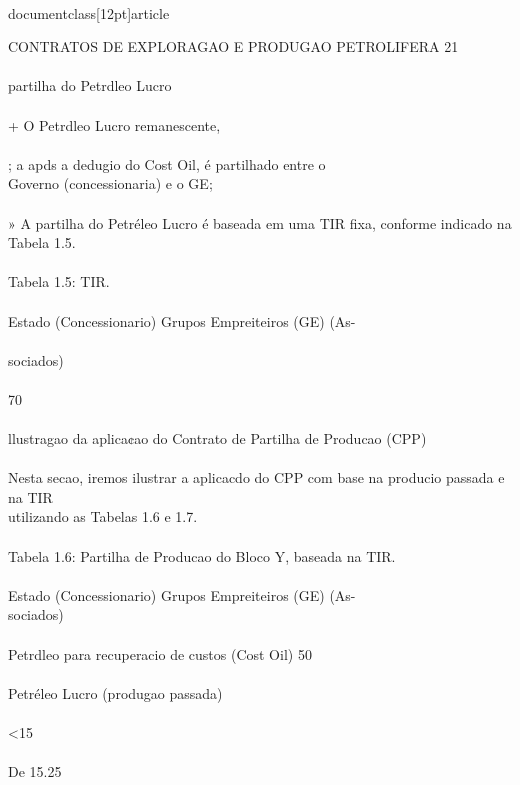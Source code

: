 \\documentclass[12pt]{article}
\begin{document}
CONTRATOS DE EXPLORAGAO E PRODUGAO PETROLIFERA 21\\
\\
partilha do Petrdleo Lucro\\
\\
+ O Petrdleo Lucro remanescente,\\
\\
; a apds a dedugio do Cost Oil, é partilhado entre o\\
Governo (concessionaria) e o GE;\\
\\
» A partilha do Petréleo Lucro é baseada em uma TIR fixa, conforme indicado na\\
Tabela 1.5.\\
\\
Tabela 1.5: TIR.\\
\\
Estado (Concessionario) Grupos Empreiteiros (GE) (As-\\
\\
sociados)\\
\\
70\\%
\\
llustragao da aplica¢ao do Contrato de Partilha de Producao (CPP)\\
\\
Nesta secao, iremos ilustrar a aplicacdo do CPP com base na producio passada e na TIR\\
utilizando as Tabelas 1.6 e 1.7.\\
\\
Tabela 1.6: Partilha de Producao do Bloco Y, baseada na TIR.\\
\\
Estado (Concessionario) Grupos Empreiteiros (GE) (As-\\
sociados)\\
\\
Petrdleo para recuperacio de custos (Cost Oil) 50\\%
\\
Petréleo Lucro (produgao passada)\\
\\
<15\\%
\\
De 15.25\\%
\end{document}
